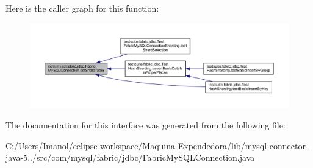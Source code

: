 Here is the caller graph for this function\+:\nopagebreak
\begin{figure}[H]
\begin{center}
\leavevmode
\includegraphics[width=350pt]{interfacecom_1_1mysql_1_1fabric_1_1jdbc_1_1_fabric_my_s_q_l_connection_a5e9287d2536bd36fcc2f63d8a27a6b9b_icgraph}
\end{center}
\end{figure}


The documentation for this interface was generated from the following file\+:\begin{DoxyCompactItemize}
\item 
C\+:/\+Users/\+Imanol/eclipse-\/workspace/\+Maquina Expendedora/lib/mysql-\/connector-\/java-\/5../src/com/mysql/fabric/jdbc/Fabric\+My\+S\+Q\+L\+Connection.\+java\end{DoxyCompactItemize}
